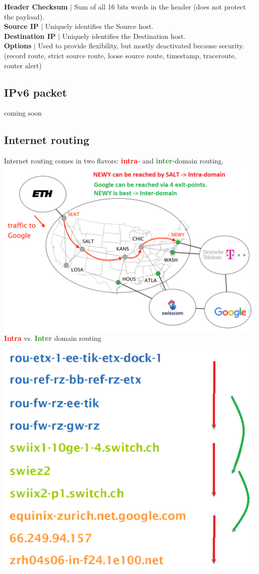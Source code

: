 \documentclass[a4paper, fontsize=8pt, landscape, DIV=1]{scrartcl}
\begin{document}
\begin{multicols*}{4}
   		\textbf{Header Checksum} $\vert$ Sum of all 16 bits words in the header (does not protect the payload).\\
   		\textbf{Source IP} $\vert$ Uniquely identifies the Source host.\\
   		\textbf{Destination IP} $\vert$ Uniquely identifies the Destination host.\\
   		\textbf{Options} $\vert$ Used to provide flexibility, but mostly deactivated because security. (record route, strict source route, loose source route, timestamp, traceroute, router alert)\\
   		
   		\subsection{IPv6 packet}
   		coming soon
   		
   		\subsection{Internet routing}
   		Internet routing comes in two flavors: \textcolor{Red}{\textbf{intra}}- and \textcolor{ForestGreen}{\textbf{inter}}-domain routing.
   		\includegraphics[width=\columnwidth]{images/Network_Layer/intra_vs_inter.png}
   		\textcolor{Red}{\textbf{Intra}} vs. \textcolor{ForestGreen}{\textbf{Inter}} domain routing
   		\begin{center}
   				\includegraphics[width=0.5\columnwidth]{images/Network_Layer/intra_vs_inter_2.png}
   		\end{center}
   	

\end{multicols*}
\end{document}
